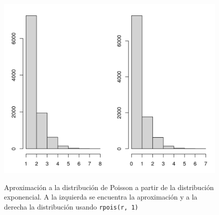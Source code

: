 \documentclass[12pt]{article}
\begin{document}
	\begin{figure}
		\centering
		\includegraphics[scale=0.6]{poisson_exponencial.png}
		\label{poisson_exp}
		\caption{Aproximación a la distribución de Poisson a partir de la distribución exponencial. A la izquierda se encuentra la aproximación y a la derecha la distribución usando \texttt{rpois(r, 1)}}
	\end{figure}
	
	
	
	


\end{document}
